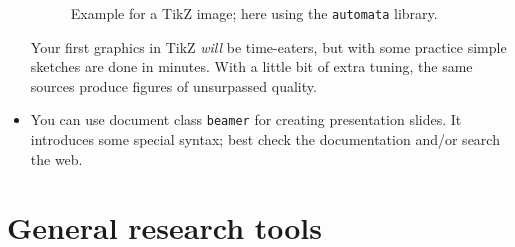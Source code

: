 \documentclass[]{rptuseminar}
\begin{document}
\begin{itemize}
\begin{figure}
\begin{center}
	    \end{center}
	    \caption{Example for a TikZ image; here using the \texttt{automata} library.}
	    \label{fig:tikz}
    \end{figure}
	Your first graphics in TikZ \emph{will} be time-eaters, but with some practice simple sketches are done in minutes.
	With a little bit of extra tuning, the same sources produce figures of unsurpassed quality.

  \item You can use document class \texttt{beamer} for creating presentation slides.
    It introduces some special syntax; best check the documentation and/or search the web.
\end{itemize}


\section{General research tools}
\end{document}
